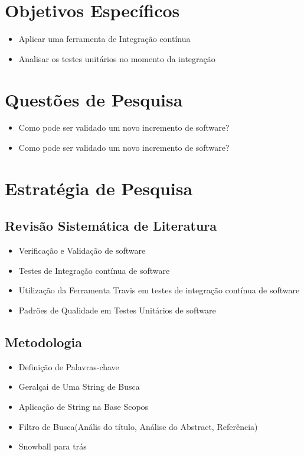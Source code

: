 \section{Objetivos Específicos }
\begin{itemize}
    \item Aplicar uma ferramenta de Integração contínua
    \item Analisar os testes unitários no momento da integração
\end{itemize}
\section{Questões de Pesquisa}
\begin{itemize}
    \item Como pode ser validado um novo incremento de software?
    \item Como pode ser validado um novo incremento de software?
\end{itemize}
\section{Estratégia de Pesquisa}
\subsection{Revisão Sistemática de Literatura}
\begin{itemize}
    \item Verificação e Validação de software
    \item Testes de Integração contínua de software
    \item  Utilização da Ferramenta Travis em testes de integração contínua de software
    \item Padrões de Qualidade em Testes Unitários de software
\end{itemize}

\subsection{Metodologia}
\begin{itemize}
    \item Definição de Palavras-chave
    \item Geralçai de Uma String de Busca
    \item Aplicação de String na Base Scopos
    \item Filtro de Busca(Anális do título, Análise do Abstract, Referência)
    \item Snowball para trás
\end{itemize}

